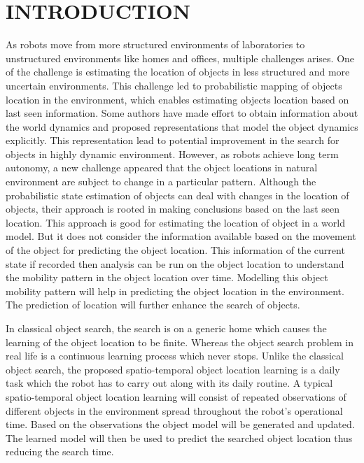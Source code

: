 
\chapter{INTRODUCTION}


As robots move from more structured environments of laboratories to
unstructured environments like homes and offices, multiple challenges arises. One
of the challenge is estimating the location of objects in less structured and more
uncertain environments. This challenge led to probabilistic mapping
of objects location in the environment, which enables estimating
objects location based on last seen information. Some authors have
made effort to obtain information about the world dynamics and proposed
representations that model the object dynamics explicitly. This representation
lead to potential improvement in the search for objects in highly dynamic environment.
However, as robots achieve long term autonomy, a new challenge appeared
that the object locations in natural environment are subject to change in a
particular pattern. Although the probabilistic state estimation of objects can
deal with changes in the location of objects, their approach is rooted in
making conclusions based on the last seen location. This approach is good for
estimating the location of object in a world model. But it does not consider the
information available based on the movement of the object for predicting the
object location. This information of the current state if recorded then analysis
can be run on the object location to understand the mobility pattern in the
object location over time. Modelling this object mobility pattern will help in
predicting the object location in the environment. The prediction of location
will further enhance the search of objects. 

In classical object search, the search is on a generic home which causes the learning of the object location to be finite. Whereas the object search problem in real life is a continuous learning process which
never stops. Unlike the classical object search,  the proposed spatio-temporal object location learning is a daily
task which the robot has to carry out along with its daily routine. A typical
spatio-temporal object location learning will consist of repeated observations
of different objects in the environment spread throughout the robot's
operational time. Based on the observations the object model will be generated and updated. The learned model will then be used to predict the searched object location thus reducing the search time.


